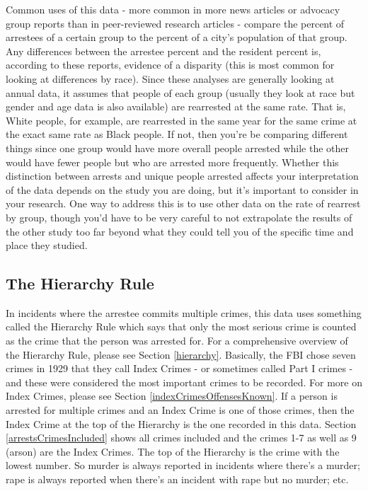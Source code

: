 \documentclass[
  12pt,
  openany]{book}
\begin{document}
Common uses of this data - more common in more news articles or advocacy group reports than in peer-reviewed research articles - compare the percent of arrestees of a certain group to the percent of a city's population of that group. Any differences between the arrestee percent and the resident percent is, according to these reports, evidence of a disparity (this is most common for looking at differences by race). Since these analyses are generally looking at annual data, it assumes that people of each group (usually they look at race but gender and age data is also available) are rearrested at the same rate. That is, White people, for example, are rearrested in the same year for the same crime at the exact same rate as Black people. If not, then you're be comparing different things since one group would have more overall people arrested while the other would have fewer people but who are arrested more frequently. Whether this distinction between arrests and unique people arrested affects your interpretation of the data depends on the study you are doing, but it's important to consider in your research. One way to address this is to use other data on the rate of rearrest by group, though you'd have to be very careful to not extrapolate the results of the other study too far beyond what they could tell you of the specific time and place they studied.

\hypertarget{the-hierarchy-rule}{%
\subsection{The Hierarchy Rule}\label{the-hierarchy-rule}}

In incidents where the arrestee commits multiple crimes, this data uses something called the Hierarchy Rule which says that only the most serious crime is counted as the crime that the person was arrested for. For a comprehensive overview of the Hierarchy Rule, please see Section \ref{hierarchy}. Basically, the FBI chose seven crimes in 1929 that they call Index Crimes - or sometimes called Part I crimes - and these were considered the most important crimes to be recorded. For more on Index Crimes, please see Section \ref{indexCrimesOffensesKnown}. If a person is arrested for multiple crimes and an Index Crime is one of those crimes, then the Index Crime at the top of the Hierarchy is the one recorded in this data. Section \ref{arrestsCrimesIncluded} shows all crimes included and the crimes 1-7 as well as 9 (arson) are the Index Crimes. The top of the Hierarchy is the crime with the lowest number. So murder is always reported in incidents where there's a murder; rape is always reported when there's an incident with rape but no murder; etc.
\end{document}
